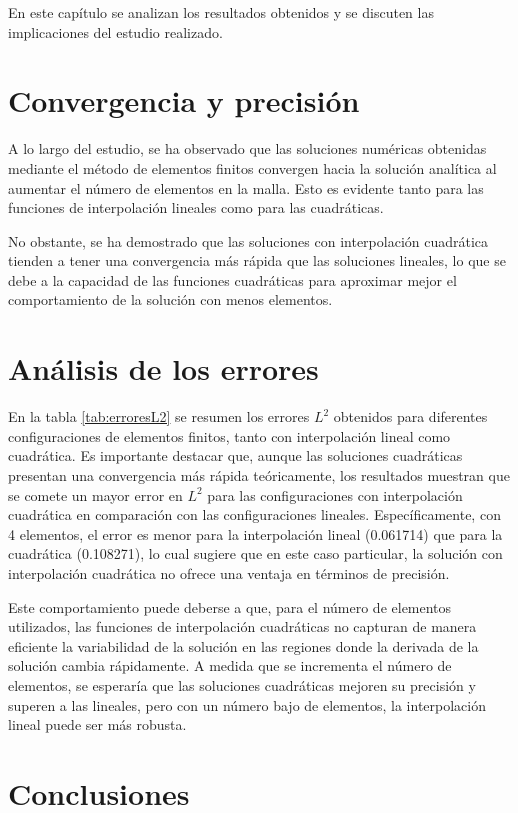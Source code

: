 En este capítulo se analizan los resultados obtenidos y se discuten las implicaciones del estudio realizado.

\section{Convergencia y precisión}

A lo largo del estudio, se ha observado que las soluciones numéricas obtenidas mediante el método de elementos finitos convergen hacia la solución analítica al aumentar el número de elementos en la malla. Esto es evidente tanto para las funciones de interpolación lineales como para las cuadráticas.

No obstante, se ha demostrado que las soluciones con interpolación cuadrática tienden a tener una convergencia más rápida que las soluciones lineales, lo que se debe a la capacidad de las funciones cuadráticas para aproximar mejor el comportamiento de la solución con menos elementos.

\section{Análisis de los errores}

En la tabla \ref{tab:erroresL2} se resumen los errores \( L^2 \) obtenidos para diferentes configuraciones de elementos finitos, tanto con interpolación lineal como cuadrática. Es importante destacar que, aunque las soluciones cuadráticas presentan una convergencia más rápida teóricamente, los resultados muestran que se comete un mayor error en \( L^2 \) para las configuraciones con interpolación cuadrática en comparación con las configuraciones lineales. Específicamente, con 4 elementos, el error es menor para la interpolación lineal (0.061714) que para la cuadrática (0.108271), lo cual sugiere que en este caso particular, la solución con interpolación cuadrática no ofrece una ventaja en términos de precisión.

Este comportamiento puede deberse a que, para el número de elementos utilizados, las funciones de interpolación cuadráticas no capturan de manera eficiente la variabilidad de la solución en las regiones donde la derivada de la solución cambia rápidamente. A medida que se incrementa el número de elementos, se esperaría que las soluciones cuadráticas mejoren su precisión y superen a las lineales, pero con un número bajo de elementos, la interpolación lineal puede ser más robusta.

\section{Conclusiones}

